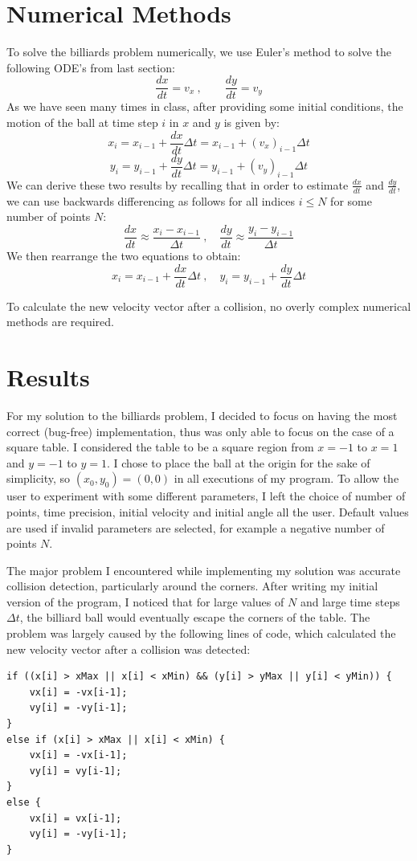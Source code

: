 \documentclass[12pt]{amsart}
\begin{document}
\section{Numerical Methods}
To solve the billiards problem numerically, we use Euler's method to solve the following ODE's from last section:
\[
	\frac{dx}{dt} = v_x \: , \qquad
	\frac{dy}{dt} = v_y
\]
\newline
As we have seen many times in class, after providing some initial conditions, the motion of the ball at time step $i$ in $x$ and $y$ is given by:
\[
	x_i = x_{i-1} + \frac{dx}{dt} \Delta t = x_{i-1} + (v_x)_{i-1} \Delta t
\]
\[
	y_i = y_{i-1} + \frac{dy}{dt} \Delta t = y_{i-1} + (v_y)_{i-1} \Delta t
\]
\newline
We can derive these two results by recalling that in order to estimate $\frac{dx}{dt}$ and $\frac{dy}{dt}$, we can use backwards differencing as
follows for all indices $i \leq N$ for some number of points $N$:
\[
	\frac{dx}{dt} \approx \frac{x_i - x_{i - 1}}{\Delta t} \:, \quad \frac{dy}{dt} \approx \frac{y_i - y_{i - 1}}{\Delta t}
\]
\newline
We then rearrange the two equations to obtain:
\[
	x_i = x_{i-1} + \frac{dx}{dt} \Delta t \: , \quad y_i = y_{i-1} + \frac{dy}{dt} \Delta t
\]

To calculate the new velocity vector after a collision, no overly complex numerical methods are required.

\section{Results}
For my solution to the billiards problem, I decided to focus on having the most correct (bug-free) implementation, thus was only able to focus
on the case of a square table. I considered the table to be a square region from $x = -1$ to $x = 1$ and $y = -1$ to $y = 1$. I chose to place
the ball at the origin for the sake of simplicity, so $(x_0, y_0) = (0, 0)$ in all executions of my program. To allow the user to experiment with
some different parameters, I left the choice of number of points, time precision, initial velocity and initial angle all the user. Default values are
used if invalid parameters are selected, for example a negative number of points $N$.

The major problem I encountered while implementing my solution was accurate collision detection, particularly around the corners. After writing
my initial version of the program, I noticed that for large values of $N$ and large time steps $\Delta t$, the billiard ball would eventually escape
the corners of the table. The problem was largely caused by the following lines of code, which calculated the new velocity vector after
a collision was detected:
\newline
\begin{lstlisting}
if ((x[i] > xMax || x[i] < xMin) && (y[i] > yMax || y[i] < yMin)) {
	vx[i] = -vx[i-1];
	vy[i] = -vy[i-1];
}
else if (x[i] > xMax || x[i] < xMin) {
	vx[i] = -vx[i-1];
	vy[i] = vy[i-1];
}
else {
	vx[i] = vx[i-1];
	vy[i] = -vy[i-1];
}
\end{lstlisting}
\end{document}
